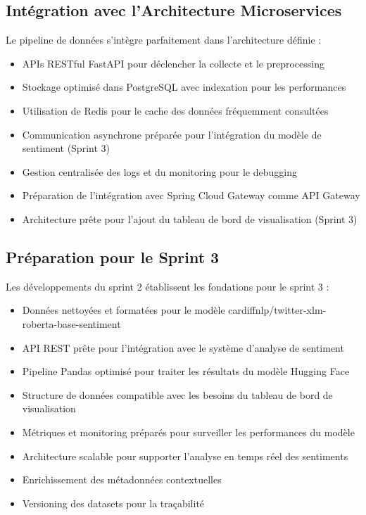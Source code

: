 \subsection{Intégration avec l'Architecture Microservices}

Le pipeline de données s'intègre parfaitement dans l'architecture définie :
\begin{itemize}
    \item APIs RESTful FastAPI pour déclencher la collecte et le preprocessing
    \item Stockage optimisé dans PostgreSQL avec indexation pour les performances
    \item Utilisation de Redis pour le cache des données fréquemment consultées
    \item Communication asynchrone préparée pour l'intégration du modèle de sentiment (Sprint 3)
    \item Gestion centralisée des logs et du monitoring pour le debugging
    \item Préparation de l'intégration avec Spring Cloud Gateway comme API Gateway
    \item Architecture prête pour l'ajout du tableau de bord de visualisation (Sprint 3)
\end{itemize}

\subsection{Préparation pour le Sprint 3}

Les développements du sprint 2 établissent les fondations pour le sprint 3 :
\begin{itemize}
    \item Données nettoyées et formatées pour le modèle cardiffnlp/twitter-xlm-roberta-base-sentiment
    \item API REST prête pour l'intégration avec le système d'analyse de sentiment
    \item Pipeline Pandas optimisé pour traiter les résultats du modèle Hugging Face
    \item Structure de données compatible avec les besoins du tableau de bord de visualisation
    \item Métriques et monitoring préparés pour surveiller les performances du modèle
    \item Architecture scalable pour supporter l'analyse en temps réel des sentiments
    \item Enrichissement des métadonnées contextuelles
    \item Versioning des datasets pour la traçabilité
\end{itemize}

